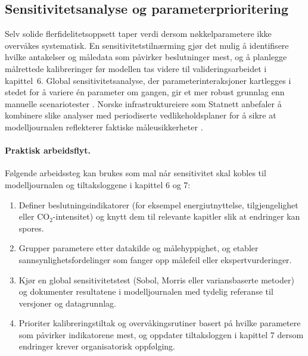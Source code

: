 \subsection{Sensitivitetsanalyse og parameterprioritering}
Selv solide flerfidelitetsoppsett taper verdi dersom nøkkelparametere ikke overvåkes systematisk. En sensitivitetstilnærming
gjør det mulig å identifisere hvilke antakelser og måledata som påvirker beslutninger mest, og å planlegge målrettede
kalibreringer før modellen tas videre til valideringsarbeidet i kapittel~6. Global
sensitivitetsanalyse, der parameterinteraksjoner kartlegges i stedet for å variere én parameter om gangen, gir et mer robust
grunnlag enn manuelle scenariotester \citep{saltelli2019sensitivity}. Norske infrastruktureiere som Statnett anbefaler å kombinere
slike analyser med periodiserte vedlikeholdsplaner for å sikre at modelljournalen reflekterer faktiske måleusikkerheter
\citep{statnett2023modellforvaltning}.

\paragraph{Praktisk arbeidsflyt.} Følgende arbeidssteg kan brukes som mal når sensitivitet skal kobles til
modelljournalen og tiltaksloggene i kapittel 6 og 7:
\begin{enumerate}
    \item Definer beslutningsindikatorer (for eksempel energiutnyttelse, tilgjengelighet eller CO$_2$-intensitet) og knytt dem til
    relevante kapitler slik at endringer kan spores.
    \item Grupper parametere etter datakilde og målehyppighet, og etabler sannsynlighetsfordelinger som fanger opp målefeil eller
    ekspertvurderinger.
    \item Kjør en global sensitivitetstest (Sobol, Morris eller variansbaserte metoder) og dokumenter resultatene i
    modelljournalen med tydelig referanse til versjoner og datagrunnlag.
    \item Prioriter kalibreringstiltak og overvåkingsrutiner basert på hvilke parametere som påvirker indikatorene mest, og oppdater
    tiltaksloggen i kapittel 7 dersom endringer krever organisatorisk oppfølging.
\end{enumerate}

